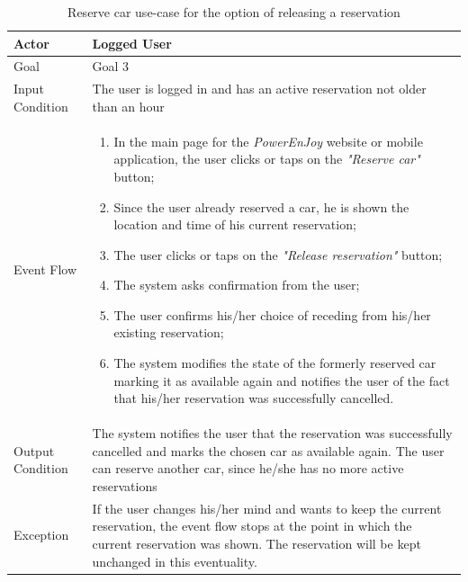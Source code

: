 \begin{table}[H]
\begin{center}
\begin{tabular}{p{} | p{}}
\hline
Actor & Logged User\\
\hline
Goal & Goal 3\\
\hline
Input Condition & The user is logged in and has an active reservation not older than an hour\\
\hline
Event Flow & 
\begin{enumerate}
\item In the main page for the \emph{PowerEnJoy} website or mobile application, the user clicks or taps on the \emph{"Reserve car"} button;
\item Since the user already reserved a car, he is shown the location and time of his current reservation;
\item The user clicks or taps on the \emph{"Release reservation"} button;
\item The system asks confirmation from the user;
\item The user confirms his/her choice of receding from his/her existing reservation;
\item The system modifies the state of the formerly reserved car marking it as available again and notifies the user of the fact that his/her reservation was successfully cancelled.
\end{enumerate} \\
\hline
Output Condition & The system notifies the user that the reservation was successfully cancelled and marks the chosen car as available again. The user can reserve another car, since he/she has no more active reservations\\
\hline
Exception & If the user changes his/her mind and wants to keep the current reservation, the event flow stops at the point in which the current reservation was shown. The reservation will be kept unchanged in this eventuality.\\
\hline
\end{tabular}
\end{center}
\caption{Reserve car use-case for the option of releasing a reservation}
\label{reserve_car_uc_alt}
\end{table}

